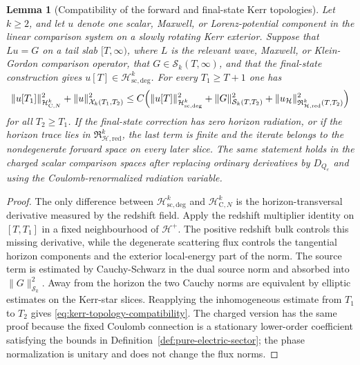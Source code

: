 \documentclass[11pt]{article}
\numberwithin{equation}{section}
\theoremstyle{plain}
\newtheorem{lemma}[theorem]{Lemma}
\theoremstyle{definition}
\theoremstyle{remark}
\newcommand{\Hcauchy}{\mathcal H_{\mathrm{C},N}}
\newcommand{\Hscatt}{\mathcal H_{\mathrm{sc,deg}}}
\begin{document}
\begin{lemma}[Compatibility of the forward and final-state Kerr topologies]\label{lem:kerr-topology-compatibility}
Let \(k\ge2\), and let \(u\) denote one scalar, Maxwell, or Lorenz-potential component in the linear comparison system on a slowly rotating Kerr exterior.  Suppose that \(Lu=G\) on a tail slab \([T,\infty)\), where \(L\) is the relevant wave, Maxwell, or Klein-Gordon comparison operator, that \(G\in\mathcal S_k(T,\infty)\), and that the final-state construction gives \(u[T]\in\Hscatt^k\).  For every \(T_1\ge T+1\) one has
\begin{equation}\label{eq:kerr-topology-compatibility}
 \|u[T_1]\|_{\Hcauchy^k}^{2}
 +\|u\|_{\mathcal X_k(T_1,T_2)}^{2}
 \le C\Bigl(\|u[T]\|_{\Hscatt^k}^{2}
 +\|G\|_{\mathcal S_k(T,T_2)}^{2}
 +\|u_{\mathcal H}\|_{\mathfrak R_{\mathcal H,\mathrm{red}}^k(T,T_2)}^{2}\Bigr)
\end{equation}
for all \(T_2\ge T_1\).  If the final-state correction has zero horizon radiation, or if the horizon trace lies in \(\mathfrak R_{\mathcal H,\mathrm{red}}^k\), the last term is finite and the iterate belongs to the nondegenerate forward space on every later slice.  The same statement holds in the charged scalar comparison spaces after replacing ordinary derivatives by \(D_{Q_e}\) and using the Coulomb-renormalized radiation variable.
\end{lemma}

\begin{proof}
The only difference between \(\Hscatt^k\) and \(\Hcauchy^k\) is the horizon-transversal derivative measured by the redshift field.  Apply the redshift multiplier identity on \([T,T_1]\) in a fixed neighbourhood of \(\mathcal H^+\).  The positive redshift bulk controls this missing derivative, while the degenerate scattering flux controls the tangential horizon components and the exterior local-energy part of the norm.  The source term is estimated by Cauchy-Schwarz in the dual source norm and absorbed into \(\|G\|_{\mathcal S_k}^{2}\).  Away from the horizon the two Cauchy norms are equivalent by elliptic estimates on the Kerr-star slices.  Reapplying the inhomogeneous estimate from \(T_1\) to \(T_2\) gives \eqref{eq:kerr-topology-compatibility}.  The charged version has the same proof because the fixed Coulomb connection is a stationary lower-order coefficient satisfying the bounds in Definition~\ref{def:pure-electric-sector}; the phase normalization is unitary and does not change the flux norms.
\end{proof}
\end{document}
